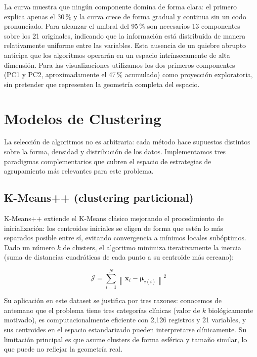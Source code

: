 \documentclass[12pt,letterpaper]{article}
\begin{document}
La curva muestra que ningún componente domina de forma clara: el primero explica apenas
el 30\,\% y la curva crece de forma gradual y continua sin un codo pronunciado. Para
alcanzar el umbral del 95\,\% son necesarios 13 componentes sobre los 21 originales,
indicando que la información está distribuida de manera relativamente uniforme entre las
variables. Esta ausencia de un quiebre abrupto anticipa que los algoritmos operarán en
un espacio intrínsecamente de alta dimensión. Para las visualizaciones utilizamos los dos
primeros componentes (PC1 y PC2, aproximadamente el 47\,\% acumulado) como proyección
exploratoria, sin pretender que representen la geometría completa del espacio.


\newpage

\section{Modelos de Clustering}

La selección de algoritmos no es arbitraria: cada método hace supuestos distintos sobre la
forma, densidad y distribución de los datos. Implementamos tres paradigmas complementarios
que cubren el espacio de estrategias de agrupamiento más relevantes para este problema.

\subsection{K-Means++ (clustering particional)}

K-Means++ extiende el K-Means clásico mejorando el procedimiento de inicialización:
los centroides iniciales se eligen de forma que estén lo más separados posible entre sí,
evitando convergencia a mínimos locales subóptimos. Dado un número $k$ de clusters, el
algoritmo minimiza iterativamente la inercia (suma de distancias cuadráticas de cada punto
a su centroide más cercano):

\[
  \mathcal{J} = \sum_{i=1}^{N} \left\| \mathbf{x}_i - \boldsymbol{\mu}_{c(i)} \right\|^2
\]

Su aplicación en este dataset se justifica por tres razones: conocemos de antemano que el
problema tiene tres categorías clínicas (valor de $k$ biológicamente motivado), es
computacionalmente eficiente con 2{,}126 registros y 21 variables, y sus centroides en el
espacio estandarizado pueden interpretarse clínicamente. Su limitación principal es que
asume clusters de forma esférica y tamaño similar, lo que puede no reflejar la geometría real.
\end{document}
